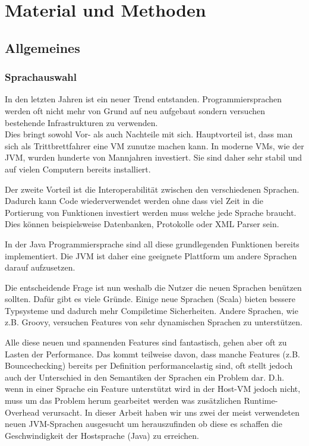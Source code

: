 \documentclass{fancydocument}
\begin{document}
\section{Material und Methoden}

\subsection{Allgemeines}

\subsubsection{Sprachauswahl}

In den letzten Jahren ist ein neuer Trend
entstanden. Programmiersprachen werden oft nicht mehr von Grund auf neu
aufgebaut sondern versuchen bestehende Infrastrukturen zu verwenden.
\\
Dies bringt sowohl Vor- als auch Nachteile mit sich. Hauptvorteil ist, dass
man sich als Trittbrettfahrer eine VM zunutze machen kann. In moderne
VMs, wie der JVM, wurden hunderte von Mannjahren investiert. Sie sind
daher sehr stabil und auf vielen Computern bereits installiert.

Der zweite Vorteil ist die Interoperabilität zwischen den
verschiedenen Sprachen. Dadurch kann Code
wiederverwendet werden ohne dass viel Zeit in die Portierung von
Funktionen investiert werden muss welche jede Sprache braucht. Dies können beispielsweise Datenbanken, Protokolle oder XML Parser sein.

In der Java Programmiersprache sind all diese grundlegenden Funktionen
bereits implementiert. Die JVM ist daher eine geeignete Plattform um andere
Sprachen darauf aufzusetzen.

Die entscheidende Frage ist nun weshalb die Nutzer die neuen
Sprachen ben\"utzen sollten. Dafür gibt es viele Gründe. Einige neue
Sprachen (Scala) bieten bessere Typsysteme und dadurch mehr
Compiletime Sicherheiten. Andere Sprachen, wie z.B. Groovy, versuchen Features
von sehr dynamischen Sprachen zu unterst\"utzen.

Alle diese neuen und spannenden Features sind fantastisch, gehen aber
oft zu Lasten der Performance. Das kommt teilweise davon, dass manche Features (z.B. Bouncechecking)
bereits per Definition performancelastig sind, oft stellt jedoch auch der Unterschied in den Semantiken der Sprachen ein Problem dar. D.h. wenn in einer Sprache ein Feature
unterst\"utzt wird in der Host-VM jedoch nicht, muss um das Problem herum
gearbeitet werden was zus\"atzlichen Runtime-Overhead verursacht. In dieser
Arbeit haben wir uns zwei der meist verwendeten neuen JVM-Sprachen
ausgesucht um herauszufinden ob diese es schaffen die Geschwindigkeit
der Hostsprache (Java) zu erreichen.
\end{document}

